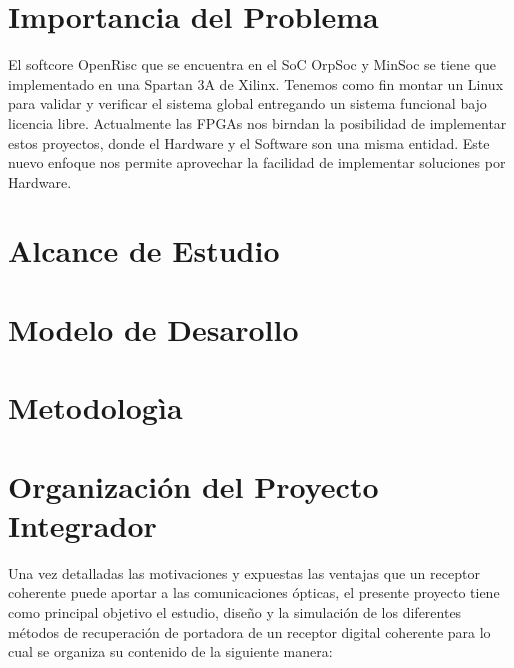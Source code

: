 \section{Importancia del Problema}

El softcore OpenRisc  que se encuentra en el SoC OrpSoc y MinSoc se tiene que implementado en una Spartan 3A de Xilinx. Tenemos como fin montar un Linux para validar y verificar el sistema global entregando un sistema funcional bajo licencia libre.
Actualmente las FPGAs nos birndan la posibilidad de implementar estos proyectos, donde el Hardware y el Software son una misma entidad. Este nuevo enfoque nos permite aprovechar la facilidad de implementar soluciones por Hardware.

\section{Alcance de Estudio}
\section{Modelo de Desarollo}
\section{Metodologìa}



 \section{Organización del Proyecto Integrador}

 Una vez detalladas  las motivaciones y expuestas las  ventajas que un
 receptor  coherente puede  aportar a  las comunicaciones  ópticas, el
 presente proyecto tiene como  principal objetivo el estudio, diseño y
 la simulación de los  diferentes métodos de recuperación de portadora
 de un receptor digital coherente para lo cual se organiza
 su contenido de la siguiente manera:\\

